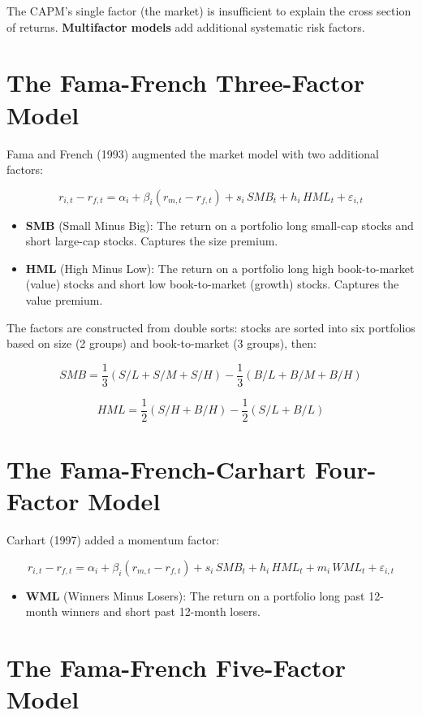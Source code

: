 \documentclass[11pt,letterpaper]{report}
\begin{document}
The CAPM's single factor (the market) is insufficient to explain the cross section of returns.  \textbf{Multifactor models} add additional systematic risk factors.

\section{The Fama-French Three-Factor Model}


Fama and French (1993) augmented the market model with two additional factors:

$$r_{i,t} - r_{f,t} = \alpha_i + \beta_i (r_{m,t} - r_{f,t}) + s_i \, SMB_t + h_i \, HML_t + \varepsilon_{i,t}$$

\begin{itemize}
  \item \textbf{SMB} (Small Minus Big): The return on a portfolio long small-cap stocks and short large-cap stocks.  Captures the size premium.
  \item \textbf{HML} (High Minus Low): The return on a portfolio long high book-to-market (value) stocks and short low book-to-market (growth) stocks.  Captures the value premium.
\end{itemize}

The factors are constructed from double sorts: stocks are sorted into six portfolios based on size (2 groups) and book-to-market (3 groups), then:

$$SMB = \frac{1}{3}(S/L + S/M + S/H) - \frac{1}{3}(B/L + B/M + B/H)$$

$$HML = \frac{1}{2}(S/H + B/H) - \frac{1}{2}(S/L + B/L)$$

\section{The Fama-French-Carhart Four-Factor Model}


Carhart (1997) added a momentum factor:

$$r_{i,t} - r_{f,t} = \alpha_i + \beta_i (r_{m,t} - r_{f,t}) + s_i \, SMB_t + h_i \, HML_t + m_i \, WML_t + \varepsilon_{i,t}$$

\begin{itemize}
  \item \textbf{WML} (Winners Minus Losers): The return on a portfolio long past 12-month winners and short past 12-month losers.
\end{itemize}

\section{The Fama-French Five-Factor Model}
\end{document}
